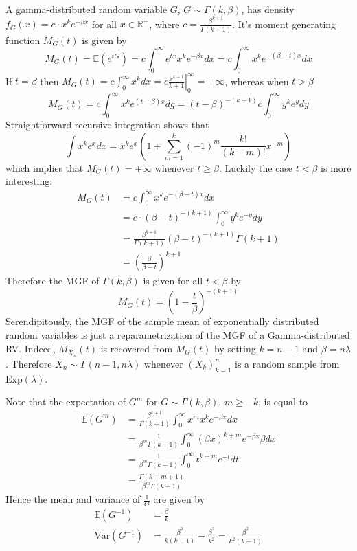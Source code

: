 \documentclass[a4paper]{article}
\newcommand{\brac}[1]{\left ( #1 \right )}
\newcommand{\induc}[1]{\left . #1 \right \vert}
\newcommand{\Real}{\mathbb{R}}
\newcommand{\Ex}[1]{\mathbb{E}\brac{#1}}
\newcommand{\Var}[1]{\text{Var}\brac{#1}}
\begin{document}
A gamma-distributed random variable $G$, $G\sim \Gamma\brac{k,\beta}$, has density $f_G\brac{x} = c\cdot x^k e^{-\beta x}$ for all $x\in \Real^+$, where $c=\frac{\beta^{k+1}}{\Gamma\brac{k+1}}$. It's moment generating function $M_G\brac{t}$ is given by \[ M_G\brac{t} = \Ex{e^{tG}} = c \int_0^\infty e^{tx} x^k e^{-\beta x} dx = c \int_0^\infty x^k e^{-\brac{\beta-t}x} dx\] If $t=\beta$ then $M_G\brac{t} = c \int_0^\infty x^k dx = c \induc{\frac{x^{k+1}}{k+1}}_0^\infty = +\infty$, whereas when $t>\beta$ \[M_G\brac{t} = c \int_0^\infty x^k e^{\brac{t-\beta}x} dg = \brac{t-\beta}^{-\brac{k+1}} c \int_0^\infty y^k e^y dy\] Straightforward recursive integration shows that \[\int x^k e^x dx = x^k e^x \brac{ 1+\sum_{m=1}^k \brac{-1}^m \frac{k!}{\brac{k-m}!} x^{-m}}\] which implies that $M_G\brac{t}=+\infty$ whenever $t\geq \beta$. 
Luckily the case $t<\beta$ is more interesting: \begin{align*}M_G\brac{t} &= c \int_0^\infty x^k e^{-\brac{\beta-t}x} dx \\ &= c\cdot \brac{\beta-t}^{-\brac{k+1}} \int_0^\infty y^k e^{-y} dy \\ &= \frac{\beta^{k+1}}{\Gamma\brac{k+1}} \brac{\beta-t}^{-\brac{k+1}} \Gamma\brac{k+1} \\ &= \brac{ \frac{\beta}{\beta-t} }^{k+1} \end{align*} Therefore the MGF of $\Gamma\brac{k,\beta}$ is given for all $t<\beta$ by \[M_G\brac{t} = \brac{1-\frac{t}{\beta}}^{-\brac{k+1}}\]Serendipitously, the MGF of the sample mean of exponentially distributed random variables is just a reparametrization of the MGF of a Gamma-distributed RV. Indeed, $M_{\bar{X}_n}\brac{t}$ is recovered from $M_G\brac{t}$ by setting $k=n-1$ and $\beta = n\lambda$. Therefore $\bar{X}_n\sim \Gamma\brac{n-1,n\lambda}$ whenever $\brac{X_k}_{k=1}^n$ is a random sample from $\text{Exp}\brac{\lambda}$. 

Note that the expectation of $G^m$ for $G\sim \Gamma\brac{k,\beta}$, $m \geq -k$, is equal to \begin{align*} \Ex{G^m} &= \frac{\beta^{k+1}}{\Gamma\brac{k+1}} \int_0^\infty x^m x^k e^{-\beta x} dx \\ &= \frac{1}{\beta^m \Gamma\brac{k+1}} \int_0^\infty \brac{\beta x}^{k+m} e^{-\beta x} \beta dx \\ &= \frac{1}{\beta^m \Gamma\brac{k+1}} \int_0^\infty t^{k+m} e^{-t} dt \\ &= \frac{\Gamma\brac{k+m+1}}{\beta^m \Gamma\brac{k+1}}\end{align*} Hence the mean and variance of $\frac{1}{G}$ are given by\begin{align*}
\Ex{G^{-1}} &= \frac{\beta}{k} \\ \Var{G^{-1}} &= \frac{\beta^2}{k\brac{k-1}}-\frac{\beta^2}{k^2} = \frac{\beta^2}{k^2\brac{k-1}}\\\end{align*}
\end{document}
